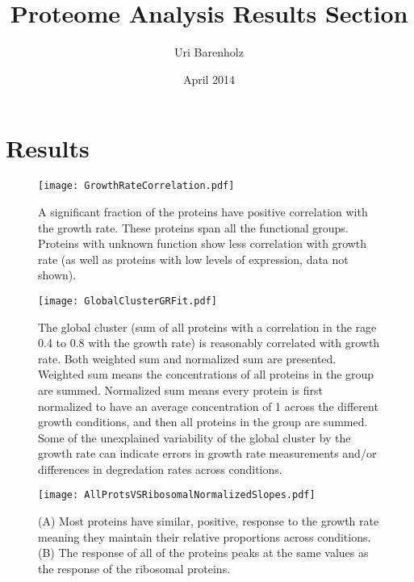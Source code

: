 \documentclass[a4page,notitlepage]{article}
\title{Proteome Analysis Results Section}
\author{Uri Barenholz}
\date{April 2014}
\begin{document}
\maketitle
\section{Results}

\begin{figure}[h]
\centering
\texttt{[image: GrowthRateCorrelation.pdf]}
\caption{
A significant fraction of the proteins have positive correlation with the growth rate.
These proteins span all the functional groups.
Proteins with unknown function show less correlation with growth rate (as well as proteins with low levels of expression, data not shown).
}
\label{growth-corr}
\end{figure}

\begin{figure}[h]
\centering
\texttt{[image: GlobalClusterGRFit.pdf]}
\caption{
The global cluster (sum of all proteins with a correlation in the rage 0.4 to 0.8 with the growth rate) is reasonably correlated with growth rate.
Both weighted sum and normalized sum are presented.
Weighted sum means the concentrations of all proteins in the group are summed.
Normalized sum means every protein is first normalized to have an average concentration of 1 across the different growth conditions, and then all proteins in the group are summed.
Some of the unexplained variability of the global cluster by the growth rate can indicate errors in growth rate measurements and/or differences in degredation rates across conditions.
}
\label{global-grcorr}
\end{figure}

\begin{figure}[h]
\centering
\texttt{[image: AllProtsVSRibosomalNormalizedSlopes.pdf]}
\caption{
    (A) Most proteins have similar, positive, response to the growth rate meaning they maintain their relative proportions across conditions.
    (B) The response of all of the proteins peaks at the same values as the response of the ribosomal proteins.
}
\label{global-fit}
\end{figure}
\end{document}
